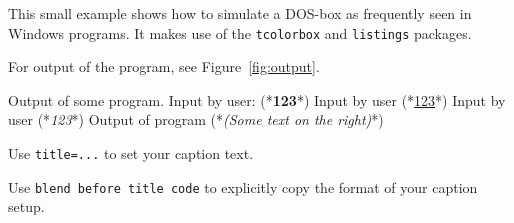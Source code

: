 \documentclass[12pt]{article}
\begin{document}
This small example shows how to simulate a DOS-box as frequently seen in Windows programs.
It makes use of the \texttt{tcolorbox} and \texttt{listings} packages.

For output of the program, see Figure~\ref{fig:output}.

\begin{dosbox}[title=Output of some program.,label=fig:output]
Output of some program.
Input by user: (*\textbf{123}*)
Input by user (*\underline{123}*)
Input by user (*\emph{123}*)
Output of program (*\hfill\normalfont\emph{(Some text on the right)}*)
\end{dosbox}

Use \texttt{title=...} to set your caption text.

Use \texttt{blend before title code} to explicitly copy the format of your caption setup.
\end{document}
